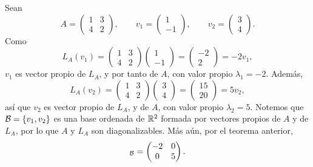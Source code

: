 \documentclass[12pt,a4paper]{book}
\begin{document}
    \begin{ejemplo}
        Sean
        \begin{equation*}
            A = \begin{pmatrix} 1 & 3 \\ 4 & 2 \end{pmatrix}, \qquad
            v_1 = \begin{pmatrix} 1 \\ -1 \end{pmatrix}, \qquad
            v_2 = \begin{pmatrix} 3 \\ 4 \end{pmatrix}.
        \end{equation*}
        Como
        \begin{equation*}
            L_A(v_1) = \begin{pmatrix} 1 & 3 \\ 4 & 2 \end{pmatrix}\begin{pmatrix} 1 \\ -1 \end{pmatrix} = \begin{pmatrix} -2 \\ 2 \end{pmatrix} = -2 v_1,
        \end{equation*}
        $v_1$ es vector propio de $L_A$, y por tanto de $A$, con valor propio $\lambda_1 = -2$. Además,
        \begin{equation*}
            L_A(v_2) = \begin{pmatrix} 1 & 3 \\ 4 & 2 \end{pmatrix}\begin{pmatrix} 3 \\ 4 \end{pmatrix} = \begin{pmatrix} 15 \\ 20 \end{pmatrix} = 5 v_2,
        \end{equation*}
        así que $v_2$ es vector propio de $L_A$, y de $A$, con valor propio $\lambda_2 = 5$. Notemos que $\mathcal{B} = \{v_1, v_2\}$ es una base ordenada de $\mathbb{R}^2$ formada por vectores propios de $A$ y de $L_A$, por lo que $A$ y $L_A$ son diagonalizables. Más aún, por el teorema anterior,
        \begin{equation*}
            [L_A]_{\BB} = \begin{pmatrix} -2 & 0 \\ 0 & 5 \end{pmatrix}.
        \end{equation*}
    \end{ejemplo}
\end{document}

